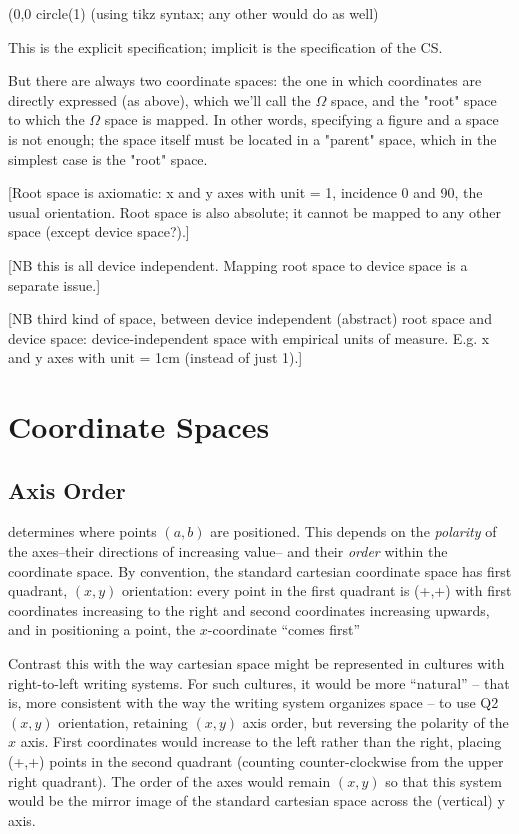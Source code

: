 \documentclass{tufte-handout}
\numberwithin{equation}{subsection}
\newcommand\cspace{coordinate space}
\begin{document}
(0,0 circle(1)  (using tikz syntax; any other would do as well)

This is the explicit specification; implicit is the specification of the CS.

But there are always two coordinate spaces: the one in which
coordinates are directly expressed (as above), which we'll call the
$\Omega$ space, and the "root" space to which the $\Omega$ space is mapped.
In other words, specifying a figure and a space is not enough; the
space itself must be located in a "parent" space, which in the
simplest case is the "root" space.

[Root space is axiomatic: x and y axes with unit = 1, incidence 0 and
  90, the usual orientation.  Root space is also absolute; it cannot be
  mapped to any other space (except device space?).]

[NB this is all device independent.  Mapping root space to device
  space is a separate issue.]

[NB third kind of space, between device independent (abstract) root
  space and device space: device-independent space with empirical units
  of measure.  E.g. x and y axes with unit = 1cm (instead of just 1).]

\section{Coordinate Spaces}
\label{sec:cspaces}

\subsection{Axis Order}
\label{subs:orientation}
\newthought{The orientation of a \cspace{}} determines where points
\((a,b)\) are positioned.  This depends on the \textit{polarity} of
the axes--their directions of increasing value-- and their
\textit{order} within the \cspace{}.  By convention, the standard
cartesian \cspace{} has first quadrant, \((x,y)\) orientation: every point
in the first quadrant is (+,+) with first coordinates increasing to
the right and second coordinates increasing upwards, and in
positioning a point, the $x$-coordinate ``comes
first''

Contrast this with the way cartesian space might be represented in
cultures with right-to-left writing systems.  For such cultures, it
would be more ``natural'' -- that is, more consistent with the way the
writing system organizes space -- to use Q2 \((x,y)\) orientation,
retaining \((x,y)\) axis order, but reversing the polarity of the
\(x\) axis.  First coordinates would increase to the left rather than
the right, placing (+,+) points in the second quadrant (counting
counter-clockwise from the upper right quadrant).  The order of the
axes would remain \((x,y)\) so that this system would be the mirror
image of the standard cartesian space across the (vertical) y axis.
\end{document}

